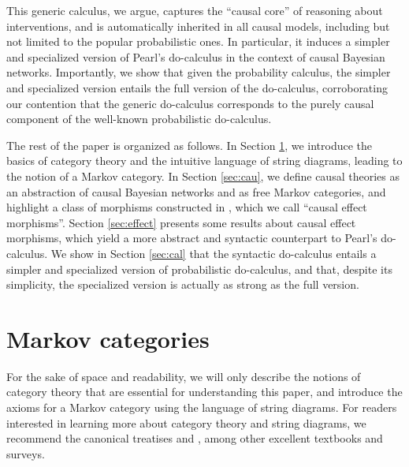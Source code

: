 \documentclass[12pt]{amsart}
\theoremstyle{plain}
\theoremstyle{definition}
\theoremstyle{remark}
\numberwithin{equation}{section}
\theoremstyle{plain}
\newcommand{\0}{\emptyset}
\begin{document}
This generic calculus, we argue, captures the ``causal core'' of reasoning about interventions, and is automatically inherited in all causal models, including but not limited to the popular probabilistic ones. In particular, it induces a simpler and specialized version of Pearl's do-calculus in the context of causal Bayesian networks. Importantly, we show that given the probability calculus, the simpler and specialized version entails the full version of the do-calculus, corroborating our contention that the generic do-calculus corresponds to the purely causal component of the well-known probabilistic do-calculus.

The rest of the paper is organized as follows. In Section \ref{sec:cat}, we introduce the basics of category theory and the intuitive language of string diagrams, leading to the notion of a Markov category. In Section \ref{sec:cau}, we define causal theories as an abstraction of causal Bayesian networks and as free Markov categories, and highlight a class of morphisms constructed in \cite{Fong:thesis}, which we call ``causal effect morphisms''. Section \ref{sec:effect} presents some results about causal effect morphisms, which yield a more abstract and syntactic counterpart to Pearl's do-calculus. We show in Section \ref{sec:cal} that the syntactic do-calculus entails a simpler and specialized version of probabilistic do-calculus, and that, despite its simplicity, the specialized version is actually as strong as the full version.

\section{Markov categories}
\label{sec:cat}
For the sake of space and readability, we will only describe the notions of category theory that are essential for understanding this paper, and introduce the axioms for a Markov category using the language of string diagrams. For readers interested in learning more about category theory and string diagrams, we recommend the canonical treatises \cite{MacLane1998} and  \cite{selinger2010survey}, among other excellent textbooks and surveys.
\end{document}
